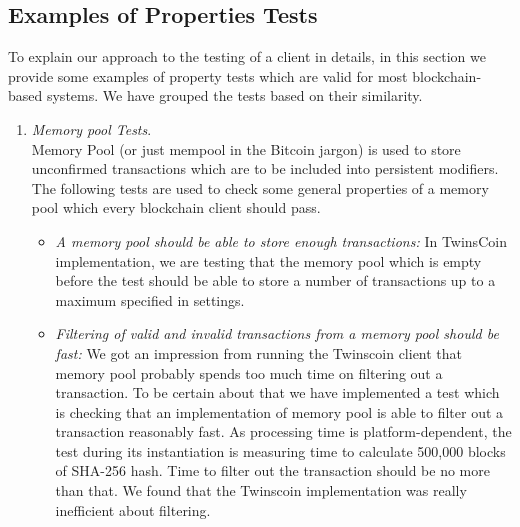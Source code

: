 
\subsection{Examples of Properties Tests}
\label{sec:examples}

To explain our approach to the testing of a client in details, in this section we provide some examples of property tests which are valid for most blockchain-based systems. We have grouped the tests based on their similarity.\\

\begin{enumerate}[\IEEEsetlabelwidth{Z}]

\item \textit{Memory pool Tests}.\\
Memory Pool (or just mempool in the Bitcoin jargon) is used to store unconfirmed transactions which are to be included into persistent modifiers. The following tests are used to check some general properties of a memory pool which every blockchain client should pass.

\begin{itemize}[]

\item \textit{A memory pool should be able to store enough transactions:} In TwinsCoin implementation, we are testing that the memory pool which is empty before the test should be able to store a number of transactions up to a maximum specified in settings.\\

\item \textit{Filtering of valid and invalid transactions from a memory pool should be fast:} We got an impression from running the Twinscoin client that memory pool probably spends too much time on filtering out a transaction. To be certain about that we have implemented a test which is checking that an implementation of memory pool is able to filter out a transaction reasonably fast. As processing time is platform-dependent, the test during its instantiation is measuring time to calculate 500,000 blocks of SHA-256 hash. Time to filter out the transaction should be no more than that. We found that the Twinscoin implementation was really inefficient about filtering.\\


\end{itemize}
\end{enumerate}
